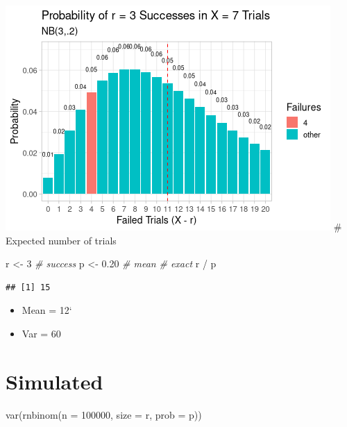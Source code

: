\documentclass[
  10pt,
]{article}
\newenvironment{Shaded}{\begin{snugshade}}{\end{snugshade}}
\newcommand{\AttributeTok}[1]{\textcolor[rgb]{0.77,0.63,0.00}{#1}}
\newcommand{\CommentTok}[1]{\textcolor[rgb]{0.56,0.35,0.01}{\textit{#1}}}
\newcommand{\DecValTok}[1]{\textcolor[rgb]{0.00,0.00,0.81}{#1}}
\newcommand{\FloatTok}[1]{\textcolor[rgb]{0.00,0.00,0.81}{#1}}
\newcommand{\FunctionTok}[1]{\textcolor[rgb]{0.00,0.00,0.00}{#1}}
\newcommand{\NormalTok}[1]{#1}
\newcommand{\OtherTok}[1]{\textcolor[rgb]{0.56,0.35,0.01}{#1}}
\newcommand{\SpecialCharTok}[1]{\textcolor[rgb]{0.00,0.00,0.00}{#1}}
\providecommand{\tightlist}{%
  \setlength{\itemsep}{0pt}\setlength{\parskip}{0pt}}
\begin{document}
\includegraphics{06.negative_binomial_files/figure-latex/unnamed-chunk-4-1.png}
\# Expected number of trials

\begin{Shaded}
\begin{Highlighting}[]
\NormalTok{r }\OtherTok{\textless{}{-}}  \DecValTok{3} \CommentTok{\# success}
\NormalTok{p }\OtherTok{\textless{}{-}}  \FloatTok{0.20}
\CommentTok{\# mean}
\CommentTok{\# exact}
\NormalTok{r }\SpecialCharTok{/}\NormalTok{ p}
\end{Highlighting}
\end{Shaded}

\begin{verbatim}
## [1] 15
\end{verbatim}

\begin{itemize}
\tightlist
\item
  Mean = 12`
\item
  Var = 60
\end{itemize}

\hypertarget{simulated}{%
\section{Simulated}\label{simulated}}

\begin{Shaded}
\begin{Highlighting}[]
\FunctionTok{var}\NormalTok{(}\FunctionTok{rnbinom}\NormalTok{(}\AttributeTok{n =} \DecValTok{100000}\NormalTok{, }\AttributeTok{size =}\NormalTok{ r, }\AttributeTok{prob =}\NormalTok{ p))}
\end{Highlighting}
\end{Shaded}
\end{document}
